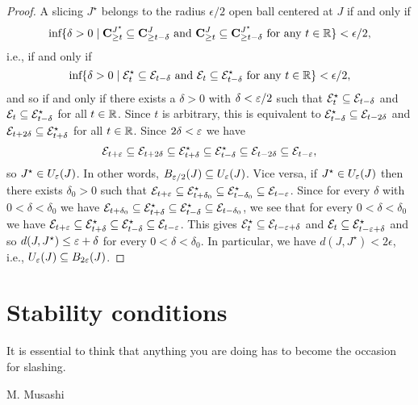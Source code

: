 \begin{proof} A slicing $J^\star$ belongs to the radius $\epsilon/2$ open ball centered at $J$ if and only if 
\[
\text{inf}\{\delta >0 \mid \mathbf{C}_{\geq t}^{J^\star}\subseteq \mathbf{C}_{\geq t-\delta}^{J} \text{ and } \mathbf{C}_{\geq t}^J\subseteq \mathbf{C}_{\geq t-\delta}^{J^\star} \text{ for any } t\in \mathbb{R}\}< \epsilon/2,
\]
i.e., if and only if
\[
\text{inf}\{\delta >0 \mid \mathcal{E}^\star_{t}\subseteq {\mathcal{E}}_{t-\delta} \text{ and } \mathcal{E}_{t}\subseteq \mathcal{E}^\star_{t-\delta} \text{ for any } t\in \mathbb{R}\}< \epsilon/2,
\]
and so if and only if there exists a $\delta>0$ with $\delta<\varepsilon/2$ such that $\mathcal{E}^\star_{t}\subseteq {\mathcal{E}}_{t-\delta}$ and  $\mathcal{E}_{t}\subseteq \mathcal{E}^\star_{t-\delta}$ for all $t\in \mathbb{R}$.
Since $t$ is arbitrary, this is equivalent to $\mathcal{E}^\star_{t-\delta}\subseteq {\mathcal{E}}_{t-2\delta}$ and  $\mathcal{E}_{t+2\delta}\subseteq \mathcal{E}^\star_{t+\delta}$ for all $t\in \mathbb{R}$.
 Since $2\delta<\varepsilon$ we have
\[
\mathcal{E}_{t+\varepsilon}\subseteq \mathcal{E}_{t+2\delta}\subseteq \mathcal{E}^\star_{t+\delta}\subseteq \mathcal{E}^\star_{t-\delta}\subseteq {\mathcal{E}}_{t-2\delta} \subseteq {\mathcal{E}}_{t-\varepsilon},
\]
so $J^\star\in U_\varepsilon(J)$. In other words, $B_{\varepsilon/2}(J)\subseteq U_\varepsilon(J)$. Vice versa, if $J^\star\in U_\varepsilon(J)$ then there exists $\delta_0>0$ such that $\mathcal{E}_{t+\varepsilon} \subseteq \mathcal{E}^\star_{t+\delta_0} \subseteq \mathcal{E}^\star_{t-\delta_0} \subseteq \mathcal{E}_{t-\varepsilon}$. Since for every $\delta$ with $0<\delta<\delta_0$ we have $\mathcal{E}_{t+\delta_0} \subseteq \mathcal{E}^\star_{t+\delta} \subseteq \mathcal{E}^\star_{t-\delta} \subseteq \mathcal{E}_{t-\delta_0}$, we see that for every $0<\delta<\delta_0$ we have $\mathcal{E}_{t+\varepsilon} \subseteq \mathcal{E}^\star_{t+\delta} \subseteq \mathcal{E}^\star_{t-\delta} \subseteq \mathcal{E}_{t-\varepsilon}$. This gives $\mathcal{E}^\star_{t} \subseteq \mathcal{E}_{t-\varepsilon+\delta}$ and $\mathcal{E}_{t} \subseteq \mathcal{E}^\star_{t-\varepsilon+\delta}$ and so $d(J,J^\star)\leq \varepsilon+\delta$ for every $0<\delta<\delta_0$. In particular, we have $d(J,J^\star)< 2\epsilon$, i.e., $U_\varepsilon(J)\subseteq B_{2\varepsilon}(J)$.
\end{proof}


\section{Stability conditions}
\epigraph{It is essential to think that anything you are doing has to become the occasion for slashing.}{M. Musashi}


